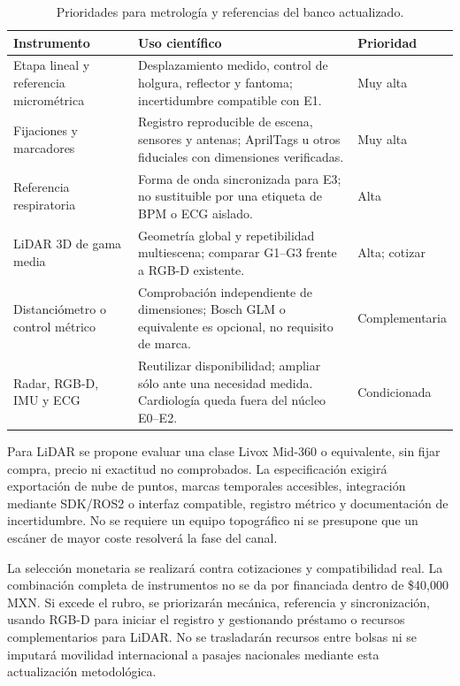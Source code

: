 \begin{table}[htbp]
\centering\small
\caption{Prioridades para metrología y referencias del banco actualizado.}
\label{tab:reference_procurement}
\begin{tabularx}{\textwidth}{P{3.4cm}L P{2.9cm}}
\toprule
Instrumento & Uso científico & Prioridad\\
\midrule
Etapa lineal y referencia micrométrica & Desplazamiento medido, control de holgura,
reflector y fantoma; incertidumbre compatible con E1. & Muy alta\\
Fijaciones y marcadores & Registro reproducible de escena, sensores y antenas;
AprilTags u otros fiduciales con dimensiones verificadas. & Muy alta\\
Referencia respiratoria & Forma de onda sincronizada para E3; no sustituible por una
etiqueta de BPM o ECG aislado. & Alta\\
LiDAR 3D de gama media & Geometría global y repetibilidad multiescena; comparar G1--G3
frente a RGB-D existente. & Alta; cotizar\\
Distanciómetro o control métrico & Comprobación independiente de dimensiones; Bosch GLM
o equivalente es opcional, no requisito de marca. & Complementaria\\
Radar, RGB-D, IMU y ECG & Reutilizar disponibilidad; ampliar sólo ante una necesidad
medida. Cardiología queda fuera del núcleo E0--E2. & Condicionada\\
\bottomrule
\end{tabularx}
\end{table}

Para LiDAR se propone evaluar una clase Livox Mid-360 o equivalente, sin fijar compra,
precio ni exactitud no comprobados. La especificación exigirá exportación de nube de
puntos, marcas temporales accesibles, integración mediante SDK/ROS2 o interfaz compatible,
registro métrico y documentación de incertidumbre. No se requiere un equipo topográfico
ni se presupone que un escáner de mayor coste resolverá la fase del canal.

La selección monetaria se realizará contra cotizaciones y compatibilidad real. La
combinación completa de instrumentos no se da por financiada dentro de \$40,000 MXN.
Si excede el rubro, se priorizarán mecánica, referencia y sincronización, usando RGB-D
para iniciar el registro y gestionando préstamo o recursos complementarios para LiDAR.
No se trasladarán recursos entre bolsas ni se imputará movilidad internacional a pasajes
nacionales mediante esta actualización metodológica.


